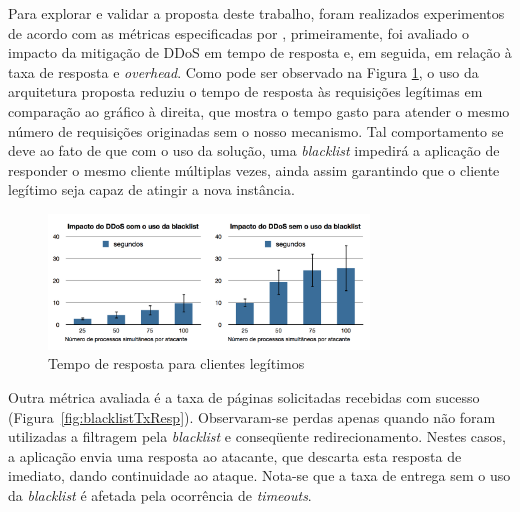 


Para explorar e validar a proposta deste trabalho, foram realizados experimentos de acordo com as métricas especificadas por \cite{4600003}, primeiramente, foi avaliado o impacto da mitigação de DDoS em tempo de resposta e, em seguida, em relação à taxa de resposta e \emph{overhead}. 
%
%
Como pode ser observado na Figura \ref{fig:blacklistSecs}, o uso da arquitetura proposta reduziu o tempo de resposta às requisições legítimas em comparação ao gráfico à direita, que mostra o tempo gasto para atender o mesmo número de requisições originadas sem o nosso mecanismo. Tal comportamento se deve ao fato de que com o uso da solução, uma \emph{blacklist} impedirá a aplicação de responder o mesmo cliente múltiplas vezes, ainda assim garantindo que o cliente legítimo seja capaz de atingir a nova instância.

\begin{figure}[h!]
\centering
\includegraphics[width=0.76\textwidth]{images/blacklistSecs.png}
\caption{Tempo de resposta para clientes legítimos}
\label{fig:blacklistSecs}
\end{figure}




Outra métrica avaliada é a taxa de páginas solicitadas recebidas com sucesso (Figura~\ref{fig:blacklistTxResp}). Observaram-se  perdas apenas quando não foram utilizadas a filtragem pela \emph{blacklist} e conseqüente redirecionamento. Nestes casos, a aplicação envia uma resposta ao atacante, que descarta esta resposta de imediato, dando continuidade ao ataque. Nota-se que a taxa de entrega sem o uso da \emph{blacklist} é afetada pela ocorrência de \emph{timeouts}.


